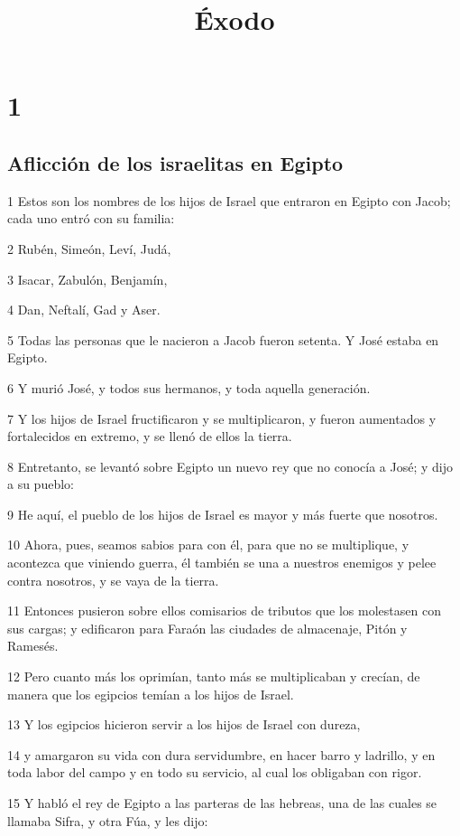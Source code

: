 

\title{Éxodo}

\chapter{1}

\section*{Aflicción de los israelitas en Egipto}

\par 1 Estos son los nombres de los hijos de Israel que entraron en Egipto con Jacob; cada uno entró con su familia:
\par 2 Rubén, Simeón, Leví, Judá,
\par 3 Isacar, Zabulón, Benjamín,
\par 4 Dan, Neftalí, Gad y Aser.
\par 5 Todas las personas que le nacieron a Jacob fueron setenta. Y José estaba en Egipto.
\par 6 Y murió José, y todos sus hermanos, y toda aquella generación.
\par 7 Y los hijos de Israel fructificaron y se multiplicaron, y fueron aumentados y fortalecidos en extremo, y se llenó de ellos la tierra.
\par 8 Entretanto, se levantó sobre Egipto un nuevo rey que no conocía a José; y dijo a su pueblo:
\par 9 He aquí, el pueblo de los hijos de Israel es mayor y más fuerte que nosotros.
\par 10 Ahora, pues, seamos sabios para con él, para que no se multiplique, y acontezca que viniendo guerra, él también se una a nuestros enemigos y pelee contra nosotros, y se vaya de la tierra.
\par 11 Entonces pusieron sobre ellos comisarios de tributos que los molestasen con sus cargas; y edificaron para Faraón las ciudades de almacenaje, Pitón y Ramesés.
\par 12 Pero cuanto más los oprimían, tanto más se multiplicaban y crecían, de manera que los egipcios temían a los hijos de Israel.
\par 13 Y los egipcios hicieron servir a los hijos de Israel con dureza,
\par 14 y amargaron su vida con dura servidumbre, en hacer barro y ladrillo, y en toda labor del campo y en todo su servicio, al cual los obligaban con rigor.
\par 15 Y habló el rey de Egipto a las parteras de las hebreas, una de las cuales se llamaba Sifra, y otra Fúa, y les dijo:
